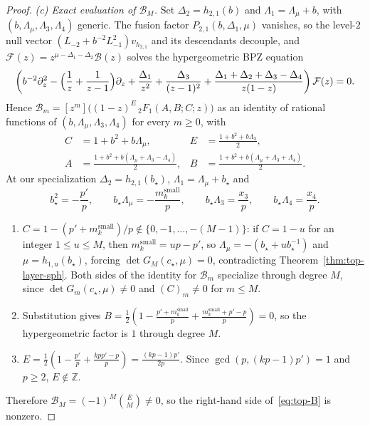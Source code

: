 \documentclass[twoside,10pt]{article}
\numberwithin{equation}{section}
\theoremstyle{slbody}
\theoremstyle{definition}
\theoremstyle{remark}
\begin{document}
\begin{proof}
\emph{(c) Exact evaluation of \(\mathcal B_M\).}  Set \(\Delta_2=h_{2,1}(b)\)
and \(\Lambda_1=\Lambda_\mu+b\), with \((b,\Lambda_\mu,\Lambda_3,\Lambda_4)\)
generic.  The fusion factor \(P_{2,1}(b,\Delta_1,\mu)\) vanishes, so the
level-\(2\) null vector \((L_{-2}+b^{-2}L_{-1}^2)v_{h_{2,1}}\) and its
descendants decouple, and \(\mathcal F(z)=z^{\mu-\Delta_1-\Delta_2}\mathcal B(z)\) solves the
hypergeometric BPZ equation~\cite[(5.2), (5.17), (5.19)]{BPZ1984}
\[
 \left(b^{-2}\partial_z^2-\Bigl(\frac1z+\frac{1}{z-1}\Bigr)\partial_z
 +\frac{\Delta_1}{z^2}+\frac{\Delta_3}{(z-1)^2}
 +\frac{\Delta_1+\Delta_2+\Delta_3-\Delta_4}{z(1-z)}\right)\mathcal F(z)=0.
\]
Hence \(\mathcal B_m=[z^m]\bigl((1-z)^E\,{}_2F_1(A,B;C;z)\bigr)\) as an
identity of rational functions of \((b,\Lambda_\mu,\Lambda_3,\Lambda_4)\)
for every \(m\geq0\), with
\begin{align*}
 C&=1+b^2+b\Lambda_\mu,&
 E&=\frac{1+b^2+b\Lambda_3}{2},\\
 A&=\frac{1+b^2+b(\Lambda_\mu+\Lambda_3-\Lambda_4)}{2},&
 B&=\frac{1+b^2+b(\Lambda_\mu+\Lambda_3+\Lambda_4)}{2}.
\end{align*}
At our specialization \(\Delta_2=h_{2,1}(b_\star)\),
\(\Lambda_1=\Lambda_\mu+b_\star\) and
\[
 b_\star^2=-\frac{p'}{p},\qquad
 b_\star\Lambda_\mu=-\frac{m^{\mathrm{small}}_k}{p},\qquad
 b_\star\Lambda_3=\frac{x_3}{p},\qquad
 b_\star\Lambda_4=\frac{x_4}{p}.
\]
\begin{enumerate}\setlength{\itemsep}{1pt}
\item \(C=1-(p'+m^{\mathrm{small}}_k)/p\notin\{0,-1,\dots,-(M-1)\}\): if
  \(C=1-u\) for an integer \(1\leq u\leq M\), then
  \(m^{\mathrm{small}}_k=up-p'\), so
  \(\Lambda_\mu=-(b_\star+ub_\star^{-1})\) and \(\mu=h_{1,u}(b_\star)\),
  forcing \(\det G_M(c_\star,\mu)=0\), contradicting
  Theorem~\ref{thm:top-layer-sph}.  Both sides of the identity for \(\mathcal B_m\)
  specialize through degree \(M\), since \(\det G_m(c_\star,\mu)\neq0\) and
  \((C)_m\neq0\) for \(m\leq M\).
\item Substitution gives
  \(B=\frac12(1-\frac{p'+m^{\mathrm{small}}_k}{p}+\frac{m^{\mathrm{small}}_k+p'-p}{p})=0\),
  so the hypergeometric factor is \(1\) through degree \(M\).
\item \(E=\frac12(1-\frac{p'}{p}+\frac{kpp'-p}{p})=\frac{(kp-1)p'}{2p}\).
  Since \(\gcd(p,(kp-1)p')=1\) and \(p\geq2\), \(E\notin\mathbb Z\).
\end{enumerate}
Therefore \(\mathcal B_M=(-1)^M\binom{E}{M}\neq0\), so the
right-hand side of~\eqref{eq:top-B} is nonzero.
\end{proof}
\end{document}
